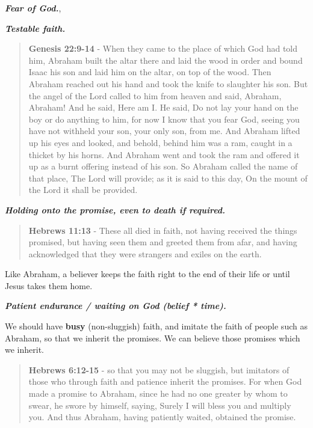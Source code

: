 \documentclass[11pt]{article}
\begin{document}
\emph{\textbf{Fear of God.}},

\emph{\textbf{Testable faith.}}

\begin{quote}
\textbf{Genesis 22:9-14} - When they came to the place of which God had told him, Abraham built the altar there and laid the wood in order and bound Isaac his son and laid him on the altar, on top of the wood. Then Abraham reached out his hand and took the knife to slaughter his son. But the angel of the Lord called to him from heaven and said, Abraham, Abraham! And he said, Here am I. He said, Do not lay your hand on the boy or do anything to him, for now I know that you fear God, seeing you have not withheld your son, your only son, from me. And Abraham lifted up his eyes and looked, and behold, behind him was a ram, caught in a thicket by his horns. And Abraham went and took the ram and offered it up as a burnt offering instead of his son. So Abraham called the name of that place, The Lord will provide; as it is said to this day, On the mount of the Lord it shall be provided.
\end{quote}

\emph{\textbf{Holding onto the promise, even to death if required.}}

\begin{quote}
\textbf{Hebrews 11:13} - These all died in faith, not having received the things promised, but having seen them and greeted them from afar, and having acknowledged that they were strangers and exiles on the earth.
\end{quote}

Like Abraham, a believer keeps the faith right to the end of their life or until Jesus takes them home.

\emph{\textbf{Patient endurance / waiting on God (belief * time).}}

We should have \textbf{busy} (non-sluggish) faith,
and imitate the faith of people such as
Abraham, so that we inherit the promises.
We can believe those promises which we inherit.

\begin{quote}
\textbf{Hebrews 6:12-15} - so that you may not be sluggish, but imitators of those who through faith and patience inherit the promises. For when God made a promise to Abraham, since he had no one greater by whom to swear, he swore by himself, saying, Surely I will bless you and multiply you. And thus Abraham, having patiently waited, obtained the promise.
\end{quote}
\end{document}
